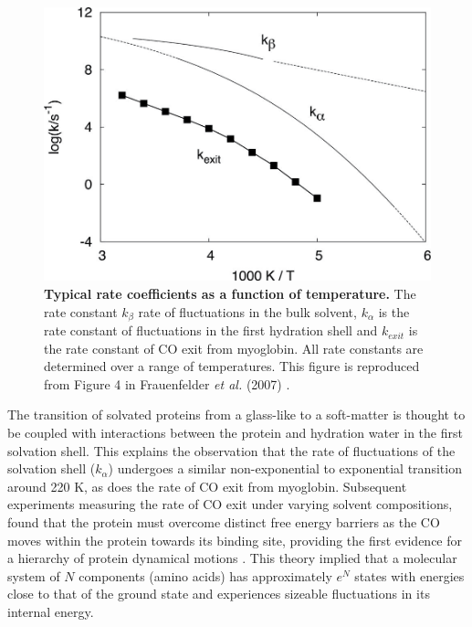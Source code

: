 \begin{figure}[!ht]
\includegraphics[scale=1]{co_exit_rate.png}
\caption[Typical rate coefficients as a function of temperature.]{\textbf{Typical rate coefficients as a function of temperature.} The rate constant $k_{\beta}$ rate of fluctuations in the bulk solvent, $k_{\alpha}$ is the rate constant of fluctuations in the first hydration shell and $k_{exit}$ is the rate constant of CO exit from myoglobin. All rate constants are determined over a range of temperatures. This figure is reproduced from Figure 4 in Frauenfelder \textit{et al.} (2007) \cite{Frauenfelder:2007aa}.}
\label{fig:co_exit_rate}
\end{figure}
%
%
The transition of solvated proteins from a glass-like to a soft-matter is thought to be coupled with interactions between the protein and hydration water in the first solvation shell. This explains the observation that the rate of fluctuations of the solvation shell ($k_{\alpha}$) undergoes a similar non-exponential to exponential transition around 220 K, as does the rate of CO exit from myoglobin. Subsequent experiments measuring the rate of CO exit under varying solvent compositions, found that the protein must overcome distinct free energy barriers as the CO moves within the protein towards its binding site, providing the first evidence for a hierarchy of protein dynamical motions \cite{Alberding:1976aa,Austin:1973aa,Austin:1975aa}. This theory implied that a molecular system of $N$ components (amino acids) has approximately $e^{N}$ states with energies close to that of the ground state and experiences sizeable fluctuations in its internal energy. 
%
%
\\\\
